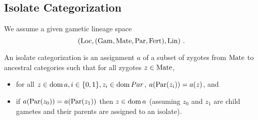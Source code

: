 \documentclass{article}
\begin{document}
\subsection{Isolate Categorization}

We assume a given gametic lineage space \[
(\mathrm{Loc}, (\mathrm{Gam}, \mathrm{Mate}, \mathrm{Par}, \mathrm{Fert}), \mathrm{Lin})
\text{ .}
\]

An isolate categorization is an assignment \(a\) of a subset of zygotes
from \(\mathrm{Mate}\) to ancestral categories such that for all zygotes
\(z \in \mathrm{Mate}\),

\begin{itemize}
\item
  for all \(z \in \operatorname{dom}{ a}, i \in \{0, 1\}, z_i \in \operatorname{dom}{ Par}\),
  \(a(\mathrm{Par}(z_i)) = a(z)\), and
\item
  if \(a(\mathrm{Par}(z_0)) = a(\mathrm{Par}(z_1))\) then \(z \in \operatorname{dom}{ a}\) (assuming
  \(z_0\) and \(z_1\) are child gametes and their parents are assigned
  to an isolate).
\end{itemize}


\printbibliography
\end{document}
